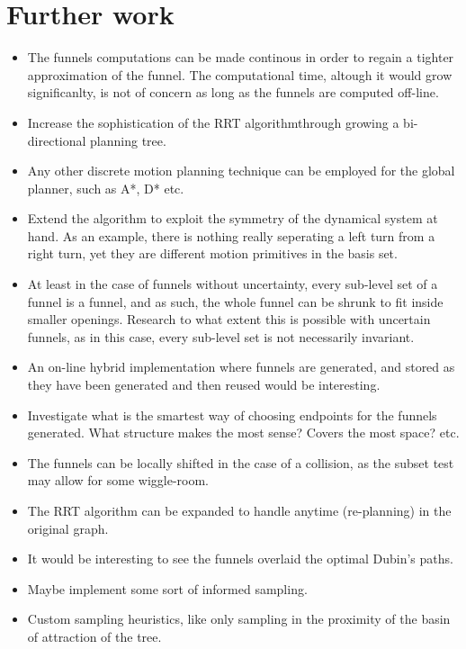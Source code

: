 \chapter{Further work}

\begin{itemize}

\item The funnels computations can be made continous in order to regain a
  tighter approximation of the funnel. The computational time, altough it would
  grow significanlty, is not of concern as long as the funnels are computed
  off-line.

\item Increase the sophistication of the \ac{RRT} algorithm\ie through growing a
  bi-directional planning tree.
  
\item Any other discrete motion planning technique can be employed for the
  global planner, such as A*, D* etc.

\item Extend the algorithm to exploit the symmetry of the dynamical system at
  hand. As an example, there is nothing really seperating a left turn from a
  right turn, yet they are different motion primitives in the basis set.

\item At least in the case of funnels without uncertainty, every sub-level set
  of a funnel is a funnel, and as such, the whole funnel can be shrunk to fit
  inside smaller openings. Research to what extent this is possible with
  uncertain funnels, as in this case, every sub-level set is not necessarily
  invariant.

  \item An on-line hybrid implementation where funnels are generated, and stored
    as they have been generated and then reused would be interesting.

  \item  Investigate what is the smartest way of choosing endpoints for the
    funnels generated. What structure makes the most sense? Covers the most
    space? etc.

  \item The funnels can be locally shifted in the case of a collision, as the
    subset test may allow for some wiggle-room.

  \item The RRT algorithm can be expanded to handle anytime (re-planning) in the
    original graph.

  \item It would be interesting to see the funnels overlaid the optimal Dubin's paths.

  \item Maybe implement some sort of informed sampling.

  \item Custom sampling heuristics, like only sampling in the proximity of the
    basin of attraction of the tree.

\end{itemize}